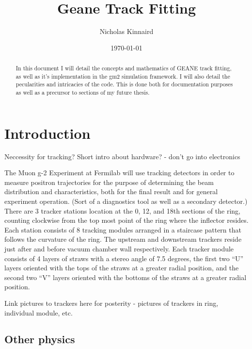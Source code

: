 \documentclass{article}
\begin{document}
\title{Geane Track Fitting}
\author{Nicholas Kinnaird}
\date{\today}
\maketitle

\begin{abstract}

    In this document I will detail the concepts and mathematics of GEANE track fitting, as well as it's implementation in the gm2 simulation framework. I will also detail the pecularities and intricacies of the code. This is done both for documentation purposes as well as a precursor to sections of my future thesis.

\end{abstract}



\section{Introduction}

  Neccessity for tracking?
  Short intro about hardware? - don't go into electronics

  The Muon g-2 Experiment at Fermilab will use tracking detectors in order to measure positron trajectories for the purpose of determining the beam distribution and characteristics, both for the final result and for general experiment operation. (Sort of a diagnostics tool as well as a secondary detector.) There are 3 tracker stations location at the 0, 12, and 18th sections of the ring, counting clockwise from the top most point of the ring where the inflector resides. Each station consists of 8 tracking modules arranged in a staircase pattern that follows the curvature of the ring. The upstream and downstream trackers reside just after and before vacuum chamber wall respectively. Each tracker module consists of 4 layers of straws with a stereo angle of 7.5 degrees, the first two ``U'' layers oriented with the tops of the straws at a greater radial position, and the second two ``V'' layers oriented with the bottoms of the straws at a greater radial position.

  Link pictures to trackers here for posterity - pictures of trackers in ring, individual module, etc. 

 \subsection{Other physics}
\end{document}
